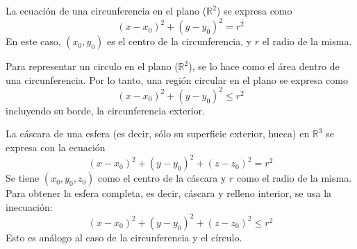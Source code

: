 \begin{definition}
    La ecuación de una circunferencia en el plano ($\mathbb{R}^2$)
    se expresa como 
    \begin{equation*}
        (x-x_0)^2+(y-y_0)^2=r^2
    \end{equation*} 
    En este caso, $(x_0,y_0)$ es el centro
    de la circunferencia, y $r$ el radio de la misma.
\end{definition}
\begin{definition}
    Para representar un circulo en el plano ($\mathbb{R}^2$), se lo hace como el
    área dentro de una circunferencia. Por lo tanto, una región circular en el plano se expresa
    como
    \begin{equation*}
        (x-x_0)^2+(y-y_0)^2\leq r^2
    \end{equation*} 
    incluyendo su borde, la circunferencia exterior.
\end{definition}
\begin{definition}
    La cáscara de una esfera (es decir, sólo su superficie exterior, hueca) 
    en $\mathbb{R}^3$ se expresa con la ecuación
    \begin{equation*}
        (x-x_0)^2+(y-y_0)^2+(z-z_0)^2=r^2
    \end{equation*}
    Se tiene $(x_0,y_0,z_0)$ como el centro de la cáscara y $r$ como el radio de la misma.
    Para obtener la esfera completa, es decir, cáscara y relleno interior, se usa la inecuación:
    \begin{equation*}
        (x-x_0)^2+(y-y_0)^2+(z-z_0)^2\leq r^2
    \end{equation*}
    Esto es análogo al caso de la circunferencia y el círculo.
\end{definition}